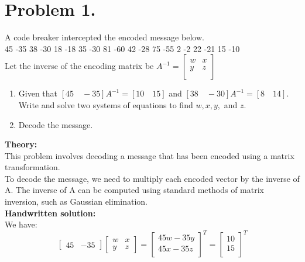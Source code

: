 \clearpage
\section{ Problem 1.}
A code breaker intercepted the encoded message below.\\
45 -35 38 -30 18 -18 35 -30 81 -60 42 -28 75 -55 2 -2 22 -21 15 -10\\[6pt]
Let the inverse of the encoding matrix be $A^{-1} =
\begin{bmatrix}
    w & x \\
    y & z \\
\end{bmatrix}$

\begin{enumerate}[label=(\alph*)]
    \item Given that $[45 \quad -35]A^{-1} = [10\quad 15]$ and $[38\quad -30]A^{-1} = [8\quad 14]$. Write and solve two systems of equations to find $w, x, y,$ and
    $z$.
    \item Decode the message.
\end{enumerate}

\vspace*{1cm}

\textbf{Theory:}\\[6pt]
This problem involves decoding a message that has been encoded using a matrix transformation.\\
To decode the message, we need to multiply each encoded vector by the inverse of A. The inverse of A can be computed using standard methods of matrix inversion, such as Gaussian elimination.\\[6pt]

\textbf{Handwritten solution:}\\[6pt]
We have:
\[
    \begin{bmatrix} 45 & -35 \end{bmatrix}
    \begin{bmatrix} w & x \\y & z \end{bmatrix}
    =
    \begin{bmatrix}
    45w -35y \\
    45x -35z \\
    \end{bmatrix}^T
    =
    \begin{bmatrix} 10 \\ 15 \\ \end{bmatrix}^T
\]

